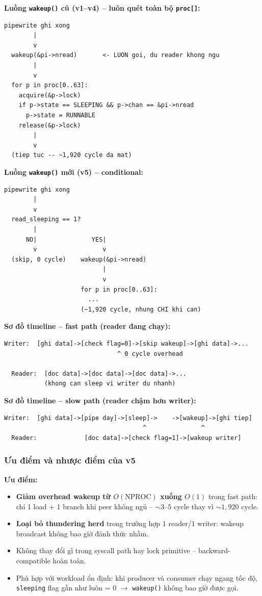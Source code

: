\documentclass[11pt,a4paper]{article}
\begin{document}
\textbf{Luồng \texttt{wakeup()} cũ (v1--v4) -- luôn quét toàn bộ \texttt{proc[]}:}

\begin{lstlisting}[style=plain]
  pipewrite ghi xong
        |
        v
  wakeup(&pi->nread)       <- LUON goi, du reader khong ngu
        |
        v
  for p in proc[0..63]:
    acquire(&p->lock)
    if p->state == SLEEPING && p->chan == &pi->nread
      p->state = RUNNABLE
    release(&p->lock)
        |
        v
  (tiep tuc -- ~1,920 cycle da mat)
\end{lstlisting}

\textbf{Luồng \texttt{wakeup()} mới (v5) -- conditional:}

\begin{lstlisting}[style=plain]
  pipewrite ghi xong
        |
        v
  read_sleeping == 1?
        |
      NO|               YES|
        v                  v
  (skip, 0 cycle)    wakeup(&pi->nread)
                           |
                           v
                     for p in proc[0..63]:
                       ...
                     (~1,920 cycle, nhung CHI khi can)
\end{lstlisting}

\textbf{Sơ đồ timeline -- fast path (reader đang chạy):}

\begin{lstlisting}[style=plain]
  Writer:  [ghi data]->[check flag=0]->[skip wakeup]->[ghi data]->...
                               ^ 0 cycle overhead

  Reader:  [doc data]->[doc data]->[doc data]->...
           (khong can sleep vi writer du nhanh)
\end{lstlisting}

\textbf{Sơ đồ timeline -- slow path (reader chậm hơn writer):}

\begin{lstlisting}[style=plain]
  Writer:  [ghi data]->[pipe day]->[sleep]->    ->[wakeup]->[ghi tiep]
                                      ^               ^
  Reader:             [doc data]->[check flag=1]->[wakeup writer]
\end{lstlisting}

\subsubsection{Ưu điểm và nhược điểm của v5}

\textbf{Ưu điểm:}
\begin{itemize}
  \item \textbf{Giảm overhead wakeup từ $O(\text{NPROC})$ xuống $O(1)$} trong fast path: chỉ 1 load + 1 branch khi peer không ngủ -- $\sim 3$--$5$ cycle thay vì $\sim 1{,}920$ cycle.
  \item \textbf{Loại bỏ thundering herd} trong trường hợp 1 reader/1 writer: wakeup broadcast không bao giờ đánh thức nhầm.
  \item Không thay đổi gì trong syscall path hay lock primitive -- backward-compatible hoàn toàn.
  \item Phù hợp với workload ổn định: khi producer và consumer chạy ngang tốc độ, \texttt{sleeping} flag gần như luôn = 0 $\rightarrow$ \texttt{wakeup()} không bao giờ được gọi.
\end{itemize}
\end{document}
